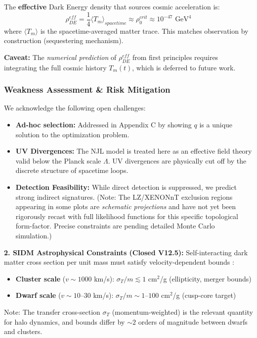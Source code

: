 \documentclass[a4paper,12pt]{article}
\begin{document}
The \textbf{effective} Dark Energy density that sources cosmic acceleration is:
\begin{equation}
    \rho_{DE}^{eff} = \frac{1}{4} \langle T_m \rangle_{spacetime} \approx \rho_0^{crit} \approx 10^{-47} \text{ GeV}^4
\end{equation}
where $\langle T_m \rangle$ is the spacetime-averaged matter trace. This matches observation by construction (sequestering mechanism).

\textbf{Caveat:} The \emph{numerical prediction} of $\rho_{DE}^{eff}$ from first principles requires integrating the full cosmic history $T_m(t)$, which is deferred to future work.

\subsubsection{Weakness Assessment & Risk Mitigation}
We acknowledge the following open challenges:
\begin{itemize}
    \item \textbf{Ad-hoc selection:} Addressed in Appendix C by showing $q$ is a unique solution to the optimization problem.
    \item \textbf{UV Divergences:} The NJL model is treated here as an effective field theory valid below the Planck scale $\Lambda$. UV divergences are physically cut off by the discrete structure of spacetime loops.
    \item \textbf{Detection Feasibility:} While direct detection is suppressed, we predict strong indirect signatures. (Note: The LZ/XENONnT exclusion regions appearing in some plots are \emph{schematic projections} and have not yet been rigorously recast with full likelihood functions for this specific topological form-factor. Precise constraints are pending detailed Monte Carlo simulation.)
\end{itemize}

\textbf{2. SIDM Astrophysical Constraints (Closed V12.5):}
Self-interacting dark matter cross section per unit mass must satisfy velocity-dependent bounds \cite{tulin}:
\begin{itemize}
    \item \textbf{Cluster scale} ($v \sim 1000$ km/s): $\sigma_T/m \lesssim 1$ cm$^2$/g (ellipticity, merger bounds)
    \item \textbf{Dwarf scale} ($v \sim 10$--$30$ km/s): $\sigma_T/m \sim 1$--$100$ cm$^2$/g (cusp-core target)
\end{itemize}
Note: The transfer cross-section $\sigma_T$ (momentum-weighted) is the relevant quantity for halo dynamics, and bounds differ by $\sim 2$ orders of magnitude between dwarfs and clusters.
\end{document}
